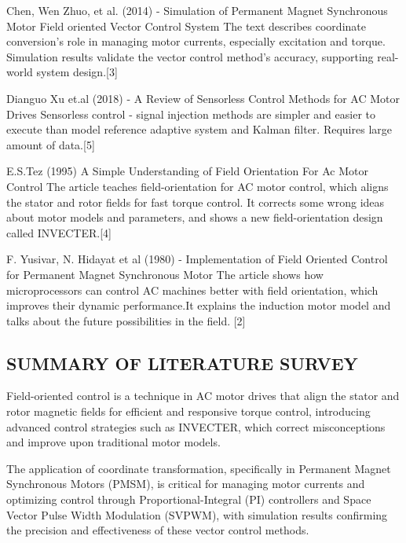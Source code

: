 Chen, Wen Zhuo, et al. (2014) -   Simulation of Permanent Magnet Synchronous Motor Field oriented Vector Control System   The text describes coordinate conversion's role in managing motor currents, especially excitation and torque.  Simulation results validate the vector control method's accuracy, supporting real-world system design.[3]


\vspace{1mm} %

Dianguo Xu  et.al (2018) -  A Review of Sensorless Control Methods for AC Motor Drives  Sensorless control - signal injection methods are simpler and easier to execute than model reference adaptive system and Kalman filter. Requires large amount of data.[5]




\vspace{1mm} %

E.S.Tez (1995) A Simple Understanding of Field Orientation For Ac Motor Control The article teaches field-orientation for AC motor control, which aligns the stator and rotor fields for fast torque control. It corrects some wrong ideas about motor models and parameters, and shows a new field-orientation design called INVECTER.[4]

\vspace{1mm} %

F. Yusivar, N. Hidayat et al (1980) -  Implementation of Field Oriented Control for Permanent Magnet Synchronous Motor     The article shows how microprocessors can control AC machines better with field orientation, which improves their dynamic performance.It explains the induction motor model and talks about the future possibilities in the field. [2]



\subsection{SUMMARY OF LITERATURE SURVEY}


\hspace{0.2in} Field-oriented control is a technique in AC motor drives that align the stator and rotor magnetic fields for efficient and responsive torque control, introducing advanced control strategies such as INVECTER, which correct misconceptions and improve upon traditional motor models.


The application of coordinate transformation, specifically in Permanent Magnet Synchronous Motors (PMSM), is critical for managing motor currents and optimizing control through Proportional-Integral (PI) controllers and Space Vector Pulse Width Modulation (SVPWM), with simulation results confirming the precision and effectiveness of these vector control methods.


